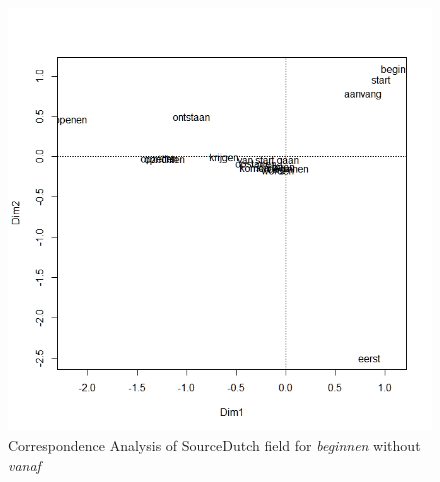 \begin{figure}
\includegraphics[height=.4\textheight]{figures/Vandevoorde2-img26.png}
\caption{\label{fig:3:26} Correspondence Analysis of SourceDutch field for \textit{beginnen} without \textit{vanaf}}
\end{figure}

